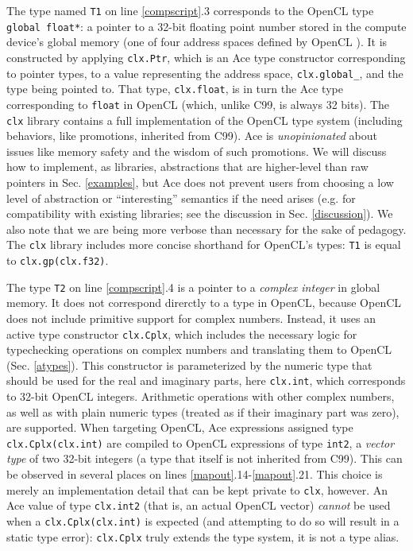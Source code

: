 \documentclass[10pt,preprint]{sigplanconf}
\begin{document}
{The type named \verb|T1| on line \ref{compscript}.3 corresponds to the OpenCL type \verb|global float*|: a pointer to a 32-bit floating point number stored in the compute device's global memory (one of four address spaces defined by OpenCL \cite{opencl11}). It is constructed by applying \verb|clx.Ptr|, which is an Ace type constructor corresponding to pointer types, to a value representing the  address space, \verb|clx.global_|, and the type being pointed to. That type, \verb|clx.float|, is in turn the Ace type corresponding to \verb|float| in OpenCL (which, unlike C99, is always 32 bits). 
The \verb|clx| library contains a full implementation of the OpenCL type system (including behaviors, like promotions, inherited from C99).
Ace is \emph{unopinionated} about issues like memory safety and the wisdom of such promotions. We will discuss how to implement, as libraries, abstractions that are higher-level than raw pointers in Sec. \ref{examples}, but Ace does not prevent users from choosing a low level of abstraction or ``interesting'' semantics if the need arises (e.g. for compatibility with existing libraries; see the discussion in Sec. \ref{discussion}). We also note that we are being more verbose than necessary for the sake of pedagogy. The \verb|clx| library includes more concise shorthand for OpenCL's types: \verb|T1| is equal to \verb|clx.gp(clx.f32)|. %

The type \verb|T2| on line \ref{compscript}.4 is a pointer to a \emph{complex integer} in global memory. It does not correspond direrctly to a type in OpenCL, because OpenCL does not include primitive support for complex numbers. Instead, it uses an active type constructor \verb|clx.Cplx|, which includes the necessary logic for typechecking operations on complex numbers and translating them to OpenCL (Sec. \ref{atypes}). This constructor is parameterized by the numeric type that should be used for the real and imaginary parts, here \verb|clx.int|, which corresponds to 32-bit OpenCL integers. Arithmetic operations with other complex numbers, as well as with plain numeric types (treated as if their imaginary part was zero), are supported. When targeting OpenCL, Ace expressions assigned type \verb|clx.Cplx(clx.int)| are compiled to OpenCL expressions of type \verb|int2|, a  \emph{vector type} of two 32-bit integers (a type that itself is not inherited from C99). This can be observed in several places on lines \ref{mapout}.14-\ref{mapout}.21. This choice is merely an implementation detail that can be kept private to \verb|clx|, however. An Ace value of type \verb|clx.int2| (that is, an actual OpenCL vector) \emph{cannot} be used when a \verb|clx.Cplx(clx.int)| is expected (and attempting to do so will result in a static type error): \verb|clx.Cplx| truly extends the type system, it is not a type alias.

}
\end{document}
